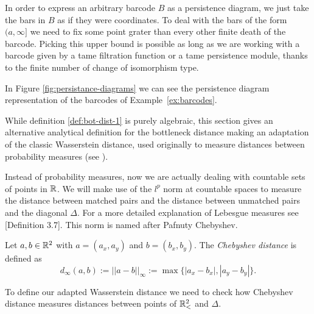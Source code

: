 \begin{example} \label{ex:persistence-diagrams}
    In order to express an arbitrary barcode $ B $ as a persistence diagram, we just take the bars in $ B $ as if they were coordinates. To deal with the bars of the form $ (a, \infty] $ we need to fix some point grater than every other finite death of the barcode. Picking this upper bound is possible as long as we are working with a barcode given by a tame filtration function or a tame persistence module, thanks to the finite number of change of isomorphism type.

    In Figure \ref{fig:persistance-diagrams} we can see the persistence diagram representation of the barcodes of Example~\ref{ex:barcodes}.
    
\end{example}

While definition \ref{def:bot-dist-1} is purely algebraic, this section gives an alternative analytical definition for the bottleneck distance making an adaptation of the classic Wasserstein distance, used originally to measure distances between probability measures (see \cite{givens}).

Instead of probability measures, now we are actually dealing with countable sets of points in $ \mathbb R $. We will make use of the $ l^p $ norm at countable spaces to measure the distance between matched pairs and the distance between unmatched pairs and the diagonal $ \Delta $. For a more detailed explanation of Lebesgue measures see \cite{rudin}[Definition 3.7]. This norm is named after Pafnuty Chebyshev.

\begin{definition}
    Let $ a, b \in \mathbb R^2 $ with $a = (a_x, a_y) $ and $ b = (b_x, b_y) $. The {\it Chebyshev distance} is defined as
    \begin{equation}
        d_\infty(a, b) := ||a-b||_{\infty} := \max \{|a_x - b_x|, |a_y - b_y|\}.
    \end{equation}
\end{definition}

To define our adapted Wasserstein distance we need to check how Chebyshev distance measures distances between points of $ \mathbb{R}_<^2 $ and $ \Delta $.

